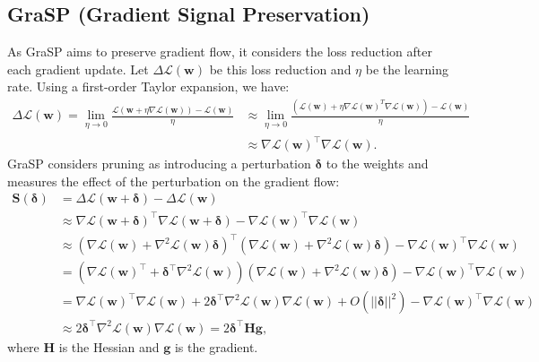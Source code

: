 \subsection{GraSP (Gradient Signal Preservation)}
As GraSP aims to preserve gradient flow, it considers the loss reduction after each gradient update. Let $\Delta \mathcal{L}(\textbf{w})$ be this loss reduction and $\eta$ be the learning rate. Using a first-order Taylor expansion, we have:
\begin{equation*}
    \begin{split}
        \Delta \mathcal{L}(\textbf{w}) = \lim_{\eta \to 0} \frac{\mathcal{L}(\textbf{w} + \eta \nabla \mathcal{L}(\textbf{w})) - \mathcal{L}(\textbf{w})}{\eta} &\approx \lim_{\eta \to 0} \frac{(\mathcal{L}(\textbf{w}) + \eta \nabla \mathcal{L}(\textbf{w})^T \nabla \mathcal{L}(\textbf{w})) - \mathcal{L}(\textbf{w})}{\eta}\\
        & \approx \nabla \mathcal{L}(\textbf{w})^\top \nabla \mathcal{L}(\textbf{w}).
    \end{split}
\end{equation*}
GraSP considers pruning as introducing a perturbation $\boldsymbol{\delta}$ to the weights and measures the effect of the perturbation on the gradient flow:
\begin{equation*}
    \begin{split}
        \textbf{S}(\boldsymbol{\delta}) &= \Delta \mathcal{L}(\textbf{w} + \boldsymbol{\delta}) - \Delta \mathcal{L}(\textbf{w})\\
        & \approx \nabla \mathcal{L}(\textbf{w} + \boldsymbol{\delta})^\top \nabla \mathcal{L}(\textbf{w} + \boldsymbol{\delta}) - \nabla \mathcal{L}(\textbf{w})^\top \nabla \mathcal{L}(\textbf{w})\\
        & \approx (\nabla \mathcal{L}(\textbf{w}) + \nabla^2 \mathcal{L}(\textbf{w}) \boldsymbol{\delta})^\top (\nabla \mathcal{L}(\textbf{w}) + \nabla^2 \mathcal{L}(\textbf{w}) \boldsymbol{\delta}) - \nabla \mathcal{L}(\textbf{w})^\top \nabla \mathcal{L}(\textbf{w})\\
        &= (\nabla \mathcal{L}(\textbf{w})^\top + \boldsymbol{\delta}^\top\nabla^2 \mathcal{L}(\textbf{w})) (\nabla \mathcal{L}(\textbf{w}) + \nabla^2 \mathcal{L}(\textbf{w}) \boldsymbol{\delta}) - \nabla \mathcal{L}(\textbf{w})^\top \nabla \mathcal{L}(\textbf{w})\\
        &= \nabla \mathcal{L}(\textbf{w})^\top \nabla \mathcal{L}(\textbf{w}) + 2\boldsymbol{\delta}^\top\nabla^2 \mathcal{L}(\textbf{w}) \nabla \mathcal{L}(\textbf{w}) + O(||\boldsymbol{\delta}||^2) - \nabla \mathcal{L}(\textbf{w})^\top \nabla \mathcal{L}(\textbf{w})\\
        & \approx 2\boldsymbol{\delta}^\top\nabla^2 \mathcal{L}(\textbf{w}) \nabla \mathcal{L}(\textbf{w}) = 2\boldsymbol{\delta}^\top \textbf{H}\textbf{g},
    \end{split}
\end{equation*}
where $\textbf{H}$ is the Hessian and $\textbf{g}$ is the gradient.

